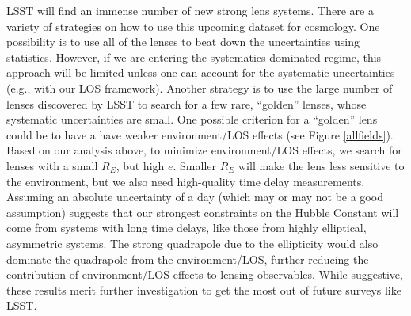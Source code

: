 LSST will find an immense number of new strong lens systems. There are a variety of strategies on how to use this upcoming dataset for cosmology. One possibility is to use all of the lenses to beat down the uncertainties using statistics. However, if we are entering the systematics-dominated regime, this approach will be limited unless one can account for the systematic uncertainties (e.g., with our LOS framework). Another strategy is to use the large number of lenses discovered by LSST to search for a few rare, ``golden'' lenses, whose systematic uncertainties are small. One possible criterion for a ``golden'' lens could be to have a have weaker environment/LOS effects (see Figure \ref{allfields}). Based on our analysis above, to minimize environment/LOS effects, we search for lenses with a small $R_E$, but high $e$. Smaller $R_E$ will make the lens less sensitive to the environment, but we also need high-quality time delay measurements. Assuming an absolute uncertainty of a day (which may or may not be a good assumption) suggests that our strongest constraints on the Hubble Constant will come from systems with long time delays, like those from highly elliptical, asymmetric systems. The strong quadrapole due to the ellipticity would also dominate the quadrapole from the environment/LOS, further reducing the contribution of environment/LOS effects to lensing observables. While suggestive, these results merit further investigation to get the most out of future surveys like LSST.
